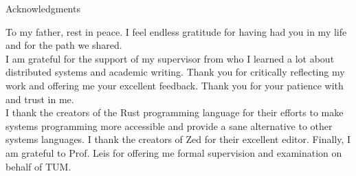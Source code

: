\thispagestyle{empty}

\vspace*{20mm}

\begin{center}
    { Acknowledgments}
\end{center}

\vspace{10mm}

To my father, rest in peace.
I feel endless gratitude for having had you in my life and for the path we shared.\\

I am grateful for the support of my supervisor \getAdvisor{}
from who I learned a lot about distributed systems and academic writing.
Thank you for critically reflecting my work and offering me your excellent feedback.
Thank you for your patience with and trust in me.\\

I thank the creators of the Rust programming language for their efforts
to make systems programming more accessible and provide a sane alternative
to other systems languages.
I thank the creators of Zed for their excellent editor.
Finally, I am grateful to Prof. Leis for offering me formal supervision
and examination on behalf of TUM.

\cleardoublepage{}
